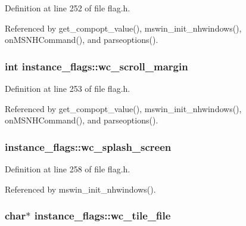 Definition at line 252 of file flag.\+h.



Referenced by get\+\_\+compopt\+\_\+value(), mswin\+\_\+init\+\_\+nhwindows(), on\+M\+S\+N\+H\+Command(), and parseoptions().

\hypertarget{structinstance__flags_acc0ddbf55d8eaa67df7b5a70d17448b8}{
\subsubsection[{wc\+\_\+scroll\+\_\+margin}]{\setlength{\rightskip}{0pt plus 5cm}int instance\+\_\+flags\+::wc\+\_\+scroll\+\_\+margin}}\label{structinstance__flags_acc0ddbf55d8eaa67df7b5a70d17448b8}


Definition at line 253 of file flag.\+h.



Referenced by get\+\_\+compopt\+\_\+value(), mswin\+\_\+init\+\_\+nhwindows(), on\+M\+S\+N\+H\+Command(), and parseoptions().

\hypertarget{structinstance__flags_af3b9b6490dafb584b08eebd3c6afc71c}{
\subsubsection[{wc\+\_\+splash\+\_\+screen}]{ instance\+\_\+flags\+::wc\+\_\+splash\+\_\+screen}}\label{structinstance__flags_af3b9b6490dafb584b08eebd3c6afc71c}


Definition at line 258 of file flag.\+h.



Referenced by mswin\+\_\+init\+\_\+nhwindows().

\hypertarget{structinstance__flags_a124beae6172167923de264a085b8bae4}{
\subsubsection[{wc\+\_\+tile\+\_\+file}]{\setlength{\rightskip}{0pt plus 5cm}char$\ast$ instance\+\_\+flags\+::wc\+\_\+tile\+\_\+file}}\label{structinstance__flags_a124beae6172167923de264a085b8bae4}


